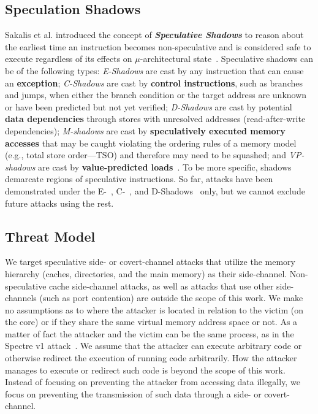 \subsection{Speculation Shadows} 
Sakalis et al. introduced the concept of \textbf{\emph{Speculative Shadows}} to reason about the earliest time an instruction becomes non-speculative and is considered safe to execute regardless of its effects on $\mu$-architectural state~\cite{sakalis+:CF2019ghost,sakalis+:ISCA2019vp}.
Speculative shadows can be of the following types: \emph{E-Shadows} are cast by any instruction that can cause an \textbf{exception}; 
\emph{C-Shadows} are cast by \textbf{control instructions}, such as branches and jumps, when either the branch condition or the target address are unknown or have been predicted but not yet verified; \emph{D-Shadows} are cast by potential \textbf{data dependencies} through stores with unresolved addresses (read-after-write dependencies); \emph{M-shadows} are cast by \textbf{speculatively executed memory accesses} that may be caught violating the ordering rules of a memory model (e.g., total store order---TSO) and therefore may need to be squashed; and \emph{VP-shadows} are cast by \textbf{value-predicted loads}~\cite{sakalis+:ISCA2019vp}. To be more specific, shadows demarcate regions of speculative instructions. So far, attacks have been demonstrated under the E-~\cite{lipp_meltdown_2018}, C-~\cite{kocher_spectre_2018}, and D-Shadows~\cite{CVE-2018-3693} only, but we cannot exclude future attacks using the rest.

\subsection{Threat Model}
\label{sec:threat}

We target speculative side- or covert-channel attacks that utilize the memory hierarchy (caches, directories, and the main memory) as their side-channel. Non-speculative cache side-channel attacks, as well as attacks that use other side-channels (such as port contention) are outside the scope of this work.
We make no assumptions as to where the attacker is located in relation to the victim (on the core) or if they share the same virtual memory address space or not.
As a matter of fact the attacker and the victim can be the same process, as in the Spectre v1 attack~\cite{kocher_spectre_2018}.
We assume that the attacker can execute arbitrary code or otherwise redirect the execution of running code arbitrarily.
How the attacker manages to execute or redirect such code is beyond the scope of this work. Instead of focusing on preventing the attacker from accessing data illegally, we focus on preventing the transmission of such data through a side- or covert-channel.

